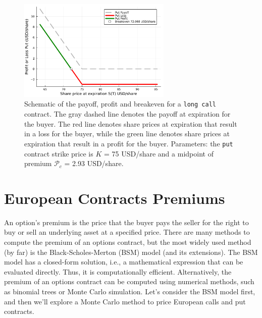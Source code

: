 \documentclass[11pt]{article}
\theoremstyle{definition}
\begin{document}
\begin{figure}[ht]
    \centering
    \includegraphics[width=0.65\textwidth]{./figs/Fig-Example-Put-K75-62DTE.pdf}
    \caption{Schematic of the payoff, profit and breakeven for a \texttt{long call} 
	contract. The gray dashed line denotes the payoff at expiration for the buyer.
	The red line denotes share prices at expiration that result in a loss for the buyer, 
	while the green line denotes share prices at expiration that result in a profit for the buyer.
	Parameters: the \texttt{put} 
	contract strike price is $K$ = 75 USD/share and a midpoint of premium $\mathcal{P}_{c}$ = 2.93 USD/share.}\label{fig:put-payoff-profit-breakeven-diagram}
\end{figure}


\section*{European Contracts Premiums}
An option's premium is the price that the buyer pays the seller for the right to buy or sell an underlying asset at a specified price.
There are many methods to compute the premium of an options contract, but the most widely used method (by far) is the Black-Scholes-Merton (BSM) model (and its extensions).
The BSM model has a closed-form solution, i.e., a mathematical expression that can be evaluated directly. Thus, it is computationally efficient.
Alternatively, the premium of an options contract can be computed using numerical methods, such as binomial trees or Monte Carlo simulation.
Let's consider the BSM model first, and then we'll explore a Monte Carlo method to price European calls and put contracts.
\end{document}
